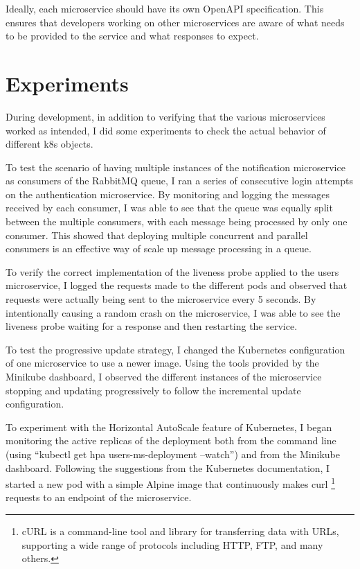 \documentclass[manuscript,screen,review]{acmart}
\begin{document}
Ideally, each microservice should have its own OpenAPI specification. This ensures that developers working on other microservices are aware of what needs to be provided to the service and what responses to expect.

\section{Experiments}
During development, in addition to verifying that the various microservices worked as intended, I did some experiments to check the actual behavior of different k8s objects.

To test the scenario of having multiple instances of the notification microservice as consumers of the RabbitMQ queue, I ran a series of consecutive login attempts on the authentication microservice. By monitoring and logging the messages received by each consumer, I was able to see that the queue was equally split between the multiple consumers, with each message being processed by only one consumer. This showed that deploying multiple concurrent and parallel consumers is an effective way of scale up message processing in a queue.

To verify the correct implementation of the liveness probe applied to the users microservice, I logged the requests made to the different pods and observed that requests were actually being sent to the microservice every 5 seconds. By intentionally causing a random crash on the microservice, I was able to see the liveness probe waiting for a response and then restarting the service.

To test the progressive update strategy, I changed the Kubernetes configuration of one microservice to use a newer image. Using the tools provided by the Minikube dashboard, I observed the different instances of the microservice stopping and updating progressively to follow the incremental update configuration.

To experiment with the Horizontal AutoScale feature of Kubernetes, I began monitoring the active replicas of the deployment both from the command line (using “kubectl get hpa users-ms-deployment --watch”) and from the Minikube dashboard. Following the suggestions from the Kubernetes documentation, I started a new pod with a simple Alpine image that continuously makes curl \footnote{cURL is a command-line tool and library for transferring data with URLs, supporting a wide range of protocols including HTTP, FTP, and many others.} requests to an endpoint of the microservice.
\end{document}
